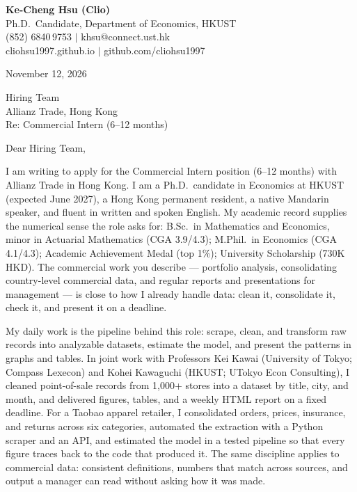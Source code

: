 \documentclass[11pt,letterpaper]{article}
\begin{document}
\noindent
{\bfseries Ke-Cheng Hsu (Clio)}\\
Ph.D.\ Candidate, Department of Economics, HKUST\\
(852) 6840\,9753 \quad $|$ \quad khsu@connect.ust.hk\\
cliohsu1997.github.io \quad $|$ \quad github.com/cliohsu1997

\vspace{0.5em}
\noindent
November 12, 2026

\vspace{0.35em}
\noindent
Hiring Team\\
Allianz Trade, Hong Kong\\
Re: Commercial Intern (6--12 months)

\vspace{0.2em}
Dear Hiring Team,

I am writing to apply for the Commercial Intern position (6--12 months) with Allianz Trade in Hong Kong. I am a Ph.D.\ candidate in Economics at HKUST (expected June 2027), a Hong Kong permanent resident, a native Mandarin speaker, and fluent in written and spoken English. My academic record supplies the numerical sense the role asks for: B.Sc.\ in Mathematics and Economics, minor in Actuarial Mathematics (CGA 3.9/4.3); M.Phil.\ in Economics (CGA 4.1/4.3); Academic Achievement Medal (top 1\%); University Scholarship (730K HKD). The commercial work you describe --- portfolio analysis, consolidating country-level commercial data, and regular reports and presentations for management --- is close to how I already handle data: clean it, consolidate it, check it, and present it on a deadline.

My daily work is the pipeline behind this role: scrape, clean, and transform raw records into analyzable datasets, estimate the model, and present the patterns in graphs and tables. In joint work with Professors Kei Kawai (University of Tokyo; Compass Lexecon) and Kohei Kawaguchi (HKUST; UTokyo Econ Consulting), I cleaned point-of-sale records from 1{,}000+ stores into a dataset by title, city, and month, and delivered figures, tables, and a weekly HTML report on a fixed deadline. For a Taobao apparel retailer, I consolidated orders, prices, insurance, and returns across six categories, automated the extraction with a Python scraper and an API, and estimated the model in a tested pipeline so that every figure traces back to the code that produced it. The same discipline applies to commercial data: consistent definitions, numbers that match across sources, and output a manager can read without asking how it was made.
\end{document}
